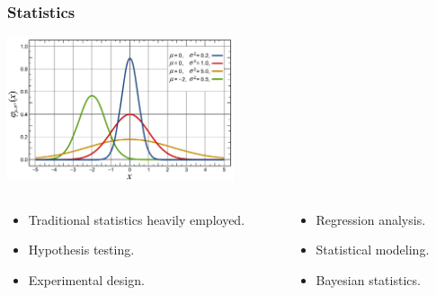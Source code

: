 \begin{frame}
\frametitle{Statistics}

\begin{center}
\includegraphics[width=0.5\textwidth]{graphics/Normal_Distribution_PDF.pdf}

\begin{columns}

\begin{column}{0.5\textwidth}
\begin{center}
\begin{itemize}
\item Traditional statistics heavily employed.
\item Hypothesis testing.
\item Experimental design.
\end{itemize}
\end{center}
\end{column}

\begin{column}{0.5\textwidth}
\begin{itemize}
\item Regression analysis.
\item Statistical modeling.
\item Bayesian statistics.
\end{itemize}
\end{column}

\end{columns}

\end{center}

\end{frame}


